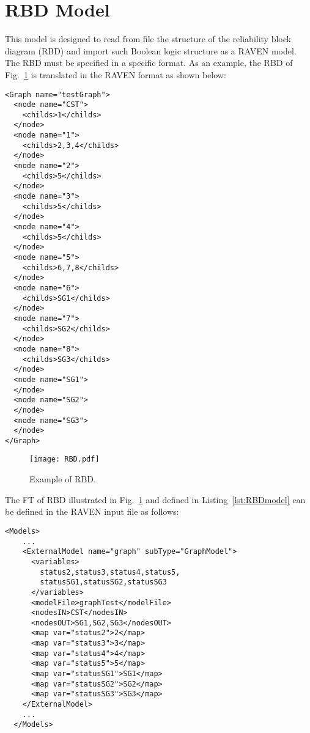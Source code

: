 \section{RBD Model}
\label{sec:RBDmodel}

This model is designed to read from file the structure of the reliability block diagram (RBD) and import such Boolean logic structure as a RAVEN model.
The RBD must be specified in a specific format. 
As an example, the RBD of Fig.~\ref{fig:RBD} is translated in the RAVEN format as shown below:

\begin{lstlisting}[style=XML,morekeywords={anAttribute},caption=RBD input file., label=lst:RBDmodel]
<Graph name="testGraph">
  <node name="CST">
    <childs>1</childs>
  </node>
  <node name="1">
    <childs>2,3,4</childs>
  </node>
  <node name="2">
    <childs>5</childs>
  </node>
  <node name="3">
    <childs>5</childs>
  </node>
  <node name="4">
    <childs>5</childs>
  </node>
  <node name="5">
    <childs>6,7,8</childs>
  </node>
  <node name="6">
    <childs>SG1</childs>
  </node>
  <node name="7">
    <childs>SG2</childs>
  </node>
  <node name="8">
    <childs>SG3</childs>
  </node>
  <node name="SG1">
  </node>
  <node name="SG2">
  </node>
  <node name="SG3">
  </node>
</Graph>
\end{lstlisting}

\begin{figure}
    \centering
    \centerline{\texttt{[image: RBD.pdf]}}
    \caption{Example of RBD.}
    \label{fig:RBD}
\end{figure}

The FT of RBD illustrated in Fig.~\ref{fig:RBD} and defined in Listing~\ref{lst:RBDmodel} can be defined in the RAVEN input file as follows:

\begin{lstlisting}[style=XML,morekeywords={anAttribute},caption=RBD model input example., label=lst:RBD_InputExample]
  <Models>
    ...
    <ExternalModel name="graph" subType="GraphModel">
      <variables>
        status2,status3,status4,status5,
        statusSG1,statusSG2,statusSG3
      </variables>
      <modelFile>graphTest</modelFile>
      <nodesIN>CST</nodesIN>
      <nodesOUT>SG1,SG2,SG3</nodesOUT>
      <map var="status2">2</map>
      <map var="status3">3</map>
      <map var="status4">4</map>
      <map var="status5">5</map>
      <map var="statusSG1">SG1</map>
      <map var="statusSG2">SG2</map>
      <map var="statusSG3">SG3</map>
    </ExternalModel>
    ...
  </Models>
\end{lstlisting}

